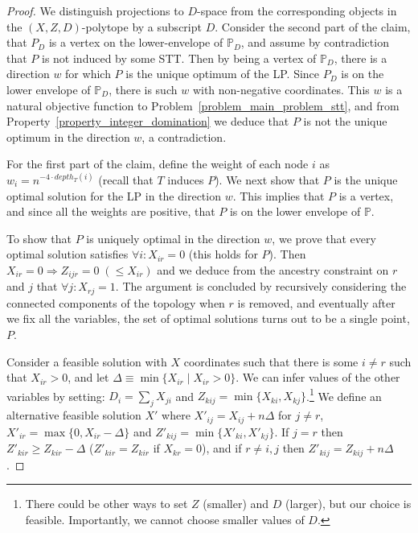 \begin{proof}
We distinguish projections to $D$-space from the corresponding objects 
in the $(X,Z,D)$-polytope by a subscript $D$. Consider the second part of the claim, that $P_D$ is a vertex on the lower-envelope of $\mathbb{P}_D$, and assume by contradiction that $P$ is not induced by some STT. Then by being a vertex of $\mathbb{P}_D$, there is a direction $w$ for which $P$ is the unique optimum of the LP. Since $P_D$ is on the lower envelope of $\mathbb{P}_D$, there is such $w$ with non-negative coordinates. This $w$ is a natural objective function to Problem~\ref{problem_main_problem_stt}, and from Property~\ref{property_integer_domination} we deduce that $P$ is not the unique optimum in the direction $w$, a contradiction.

For the first part of the claim, define the weight of each node $i$ as $w_i = n^{-4 \cdot depth_T(i)}$ (recall that $T$ induces $P$). We next show that $P$ is the unique optimal solution for the LP in the direction $w$. This implies that $P$ is a vertex, and since all the weights are positive, that $P$ is on the lower envelope of $\mathbb{P}$.

To show that $P$ is uniquely optimal in the direction $w$, we prove that every optimal solution satisfies $\forall i: X_{ir}=0$ (this holds for $P$). Then $X_{ir}=0 \Rightarrow Z_{ijr} = 0 \; (\le X_{ir})$ and we deduce from the ancestry constraint on $r$ and $j$ that $\forall j: X_{rj} = 1$. The argument is concluded by recursively considering the connected components of the topology when $r$ is removed, and eventually after we fix all the variables, the set of optimal solutions turns out to be a single point, $P$.

Consider a feasible solution with $X$ coordinates such that there is some $i \ne r$ such that $X_{ir} > 0$, and let $\Delta \equiv \min \{ X_{ir} \mid X_{ir} > 0 \}$. We can infer values of  the other variables by setting: $D_i = \sum_{j}{X_{ji}}$ and $Z_{kij} = \min\{X_{ki},X_{kj}\}$.\footnote{There could be other ways to set $Z$ (smaller) and $D$ (larger), but our choice is feasible. Importantly, we cannot choose smaller values of $D$.} We define an alternative feasible solution $X'$ where $X'_{ij} = X_{ij} + n\Delta$ for $j \ne r$, $X'_{ir} = \max\{0,X_{ir} - \Delta\}$ and $Z'_{kij} = \min\{ X'_{ki},X'_{kj} \}$. If $j=r$ then $Z'_{kir} \ge Z_{kir} - \Delta$ ($Z'_{kir} = Z_{kir}$ if $X_{kr} = 0$), and if $r \ne i,j$ then $Z'_{kij} = Z_{kij} + n\Delta$.


\end{proof}
